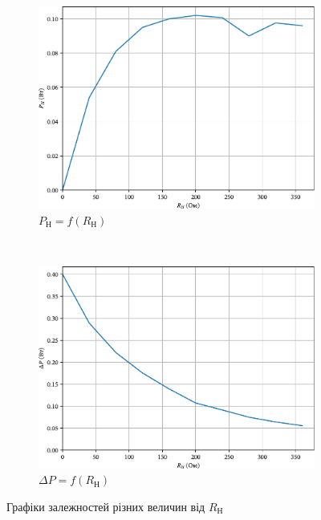 \documentclass[a4paper,oneside,DIV=10,12pt]{scrartcl}
\begin{document}
\begin{figure}
			\begin{subfigure}[b]{0.49\textwidth}
				\includegraphics[width=\textwidth]{05-p-nag-edited.pdf}
				\caption{$P_{\text{Н}} = f(R_{\text{Н}})$}
			\end{subfigure}
			~
			\begin{subfigure}[b]{0.49\textwidth}
				\includegraphics[width=\textwidth]{06-delta-p-edited.pdf}
				\caption{$\Delta P = f(R_{\text{Н}})$}
			\end{subfigure}
		\caption{Графіки залежностей різних величин від $R_{\text{Н}}$}
		\end{figure}
		
\end{document}
